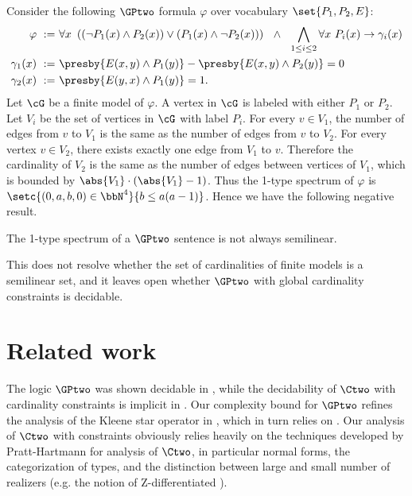 Consider the following $\GPtwo$ formula $\varphi$ over vocabulary $\set{P_1, P_2, E}$:
\begin{equation*}
    \begin{aligned}
        \varphi\ :=\ &
        \forall x\ 
        \left(
            \left(\neg P_1(x) \land P_2(x)\right) \lor
            \left(P_1(x) \land \neg P_2(x)\right)
        \right)
        \ \ \land \ \ 
        \bigwedge_{1 \le i \le 2} \forall x\ P_i(x) \to \gamma_i(x) \\
        \gamma_1(x)\ :=\ &
        \presby{E(x, y) \land P_1(y)} - \presby{E(x, y) \land P_2(y)} = 0 \\
        \gamma_2(x)\ :=\ &
        \presby{E(y, x) \land P_1(y)} = 1.
    \end{aligned}
\end{equation*}
Let $\cG$ be a finite model of $\varphi$.
A vertex in $\cG$ is labeled with either $P_1$ or $P_2$.
Let $V_i$ be the set of vertices in $\cG$ with label $P_i$.
For every $v \in V_1$, the number of edges from $v$ to $V_1$
is the same as the number of edges from $v$ to $V_2$.
For every vertex $v \in V_2$, there exists exactly one edge from $V_1$ to $v$.
Therefore the cardinality of $V_2$ is the same as the number of edges between vertices of $V_1$,
which is bounded by $\abs{V_1}\cdot(\abs{V_1}-1)$.
Thus the 1-type spectrum of $\varphi$ is $\setc{(0, a, b, 0) \in \bbN^4}{b \le a(a-1)}$.
Hence we have the following negative result.
\begin{theorem}
    The 1-type spectrum of a $\GPtwo$ sentence is not always semilinear.
\end{theorem}

This does not resolve whether the set of cardinalities of finite models is a semilinear set, and
it leaves open whether $\GPtwo$ with global cardinality constraints is decidable.


\section{Related work} \label{sec:related}

The logic $\GPtwo$ was shown decidable in \cite{percentage,twovarpres}, while the decidability
of $\Ctwo$ with cardinality constraints is implicit in \cite{tonyeryk, ultimatelyperiodic}. Our complexity bound for $\GPtwo$ refines the analysis of the Kleene star operator in \cite{usicalp}, which in turn relies on \cite{kleenestar}. Our analysis of $\Ctwo$ with constraints obviously relies heavily on the techniques developed by Pratt-Hartmann for analysis of $\Ctwo$, in particular normal forms, the categorization of types, and the distinction between large and small number of realizers (e.g. the notion of Z-differentiated \cite{ctwocomplexity,gctwocomplexity}).

